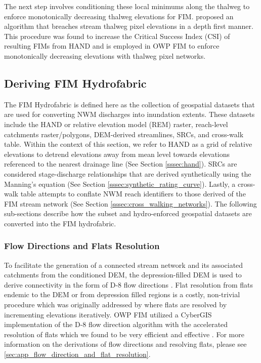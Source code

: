 \documentclass[draft]{dependencies/agujournal2019}
\begin{document}
The next step involves conditioning these local minimums along the thalweg to enforce monotonically decreasing thalweg elevations for FIM.
 proposed an algorithm that breaches stream thalweg pixel elevations in a depth first manner. 
This procedure was found to increase the Critical Success Index (CSI) of resulting FIMs from HAND and is employed in OWP FIM to enforce monotonically decreasing elevations with thalweg pixel networks.
%
\subsection{Deriving FIM Hydrofabric}
\label{ssec:deriving_fim_hydrofabric}
%
The FIM Hydrofabric is defined here as the collection of geospatial datasets that are used for converting NWM discharges into inundation extents.
These datasets include the HAND or relative elevation model (REM) raster, reach-level catchments raster/polygons, DEM-derived streamlines, SRCs, and cross-walk table.
Within the context of this section, we refer to HAND as a grid of relative elevations to detrend elevations away from mean level towards elevations referenced to the nearest drainage line (See Section \ref{sssec:hand}).
SRCs are considered stage-discharge relationships that are derived synthetically using the Manning's equation (See Section \ref{sssec:synthetic_rating_curve}).
Lastly, a cross-walk table attempts to conflate NWM reach identifiers to those derived of the FIM stream network (See Section \ref{sssec:cross_walking_networks}).
The following sub-sections describe how the subset and hydro-enforced geospatial datasets are converted into the FIM hydrofabric.
%
\subsubsection{Flow Directions and Flats Resolution}
\label{ssec:flow_direction_and_flat_resolution}
%
To facilitate the generation of a connected stream network and its associated catchments from the conditioned DEM, the depression-filled DEM is used to derive connectivity in the form of D-8 flow directions \cite{o1984extraction}.
Flat resolution from flats endemic to the DEM or from depression filled regions is a costly, non-trivial procedure which was originally addressed by  where flats are resolved by incrementing elevations iteratively.
OWP FIM utilized a CyberGIS implementation of the D-8 flow direction algorithm with the accelerated resolution of flats which we found to be very efficient and effective \cite{survila2016scalable,cybergis2016}.
For more information on the derivations of flow directions and resolving flats, please see \ref{sec:app_flow_direction_and_flat_resolution}.
%
\end{document}
